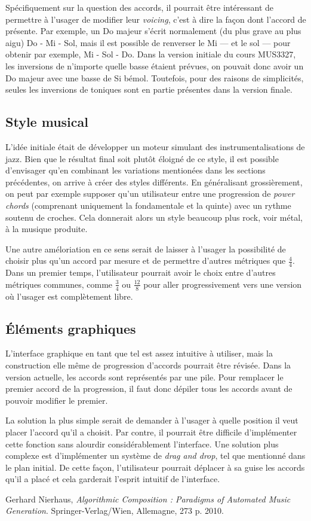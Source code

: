 \documentclass[letterpaper,12pt]{scrartcl}
\begin{document}
		Spécifiquement sur la question des accords, il pourrait être intéressant de permettre à l'usager de modifier leur \textit{voicing}, c'est à dire la façon dont l'accord de présente. Par exemple, un Do majeur s'écrit normalement (du plus grave au plus aigu) Do - Mi - Sol, mais il est possible de renverser le Mi --- et le sol --- pour obtenir par exemple, Mi - Sol - Do. Dans la version initiale du cours MUS3327, les inversions de n'importe quelle basse étaient prévues, on pouvait donc avoir un Do majeur avec une basse de Si bémol. Toutefois, pour des raisons de simplicités, seules les inversions de toniques sont en partie présentes dans la version finale. 
		
	\subsection{Style musical}
		L'idée initiale était de développer un moteur simulant des instrumentalisations de jazz. Bien que le résultat final soit plutôt éloigné de ce style, il est possible d'envisager qu'en combinant les variations mentionées dans les sections précédentes, on arrive à créer des styles différents. En généralisant grossièrement, on peut par exemple supposer qu'un utilisateur entre une progression de \textit{power chords} (comprenant uniquement la fondamentale et la quinte) avec un rythme soutenu de croches. Cela donnerait alors un style beaucoup plus rock, voir métal, à la musique produite. 
		
	Une autre améloriation en ce sens serait de laisser à l'usager la possibilité de choisir plus qu'un accord par mesure et de permettre d'autres métriques que $\frac{4}{4}$. Dans un premier temps, l'utilisateur pourrait avoir le choix entre d'autres métriques communes, comme $\frac{3}{4}$ ou $\frac{12}{8}$ pour aller progressivement vers une version où l'usager est complètement libre.

		\subsection{Éléments graphiques}
		L'interface graphique en tant que tel est assez intuitive à utiliser, mais la construction elle même de progression d'accords pourrait être révisée. Dans la version actuelle, les accords sont représentés par une pile. Pour remplacer le premier accord de la progression, il faut donc dépiler tous les accords avant de pouvoir modifier le premier.
		
		 La solution la plus simple serait de demander à l'usager à quelle position il veut placer l'accord qu'il a choisit. Par contre, il pourrait être difficile d'implémenter cette fonction sans alourdir considérablement l'interface. Une solution plus complexe est d'implémenter un système de \textit{drag and drop}, tel que mentionné dans le plan initial. De cette façon, l'utilisateur pourrait déplacer à sa guise les accords qu'il a placé et cela garderait l'esprit intuitif de l'interface.
		 
\begin{thebibliography}{9}
          Gerhard Nierhaus,
          \emph{Algorithmic Composition : Paradigms of Automated Music Generation}.
          Springer-Verlag/Wien, Allemagne,
          273 p.
          2010.

\end{thebibliography}
\end{document}
